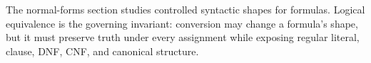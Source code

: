 \begin{remark*}[Exposition]
The normal-forms section studies controlled syntactic shapes for formulas.
Logical equivalence is the governing invariant: conversion may change a
formula's shape, but it must preserve truth under every assignment while
exposing regular literal, clause, DNF, CNF, and canonical structure.
\end{remark*}
